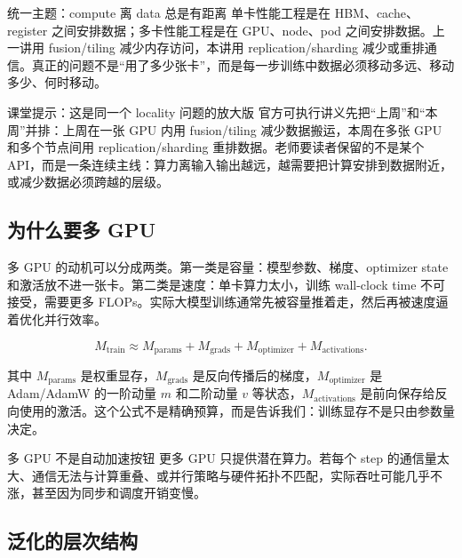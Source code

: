 \begin{importantbox}{统一主题：compute 离 data 总是有距离}
单卡性能工程是在 HBM、cache、register 之间安排数据；多卡性能工程是在 GPU、node、pod 之间安排数据。上一讲用 fusion/tiling 减少内存访问，本讲用 replication/sharding 减少或重排通信。真正的问题不是“用了多少张卡”，而是每一步训练中数据必须移动多远、移动多少、何时移动。
\end{importantbox}

\begin{knowledgebox}{课堂提示：这是同一个 locality 问题的放大版}
官方可执行讲义先把“上周”和“本周”并排：上周在一张 GPU 内用 fusion/tiling 减少数据搬运，本周在多张 GPU 和多个节点间用 replication/sharding 重排数据。老师要读者保留的不是某个 API，而是一条连续主线：算力离输入输出越远，越需要把计算安排到数据附近，或减少数据必须跨越的层级。
\end{knowledgebox}

\subsection{为什么要多 GPU}

多 GPU 的动机可以分成两类。第一类是容量：模型参数、梯度、optimizer state 和激活放不进一张卡。第二类是速度：单卡算力太小，训练 wall-clock time 不可接受，需要更多 FLOPs。实际大模型训练通常先被容量推着走，然后再被速度逼着优化并行效率。

\[
M_{\text{train}}
    \approx M_{\text{params}}
    + M_{\text{grads}}
    + M_{\text{optimizer}}
    + M_{\text{activations}} .
\]

其中 \(M_{\text{params}}\) 是权重显存，\(M_{\text{grads}}\) 是反向传播后的梯度，\(M_{\text{optimizer}}\) 是 Adam/AdamW 的一阶动量 \(m\) 和二阶动量 \(v\) 等状态，\(M_{\text{activations}}\) 是前向保存给反向使用的激活。这个公式不是精确预算，而是告诉我们：训练显存不是只由参数量决定。

\begin{warningbox}{多 GPU 不是自动加速按钮}
更多 GPU 只提供潜在算力。若每个 step 的通信量太大、通信无法与计算重叠、或并行策略与硬件拓扑不匹配，实际吞吐可能几乎不涨，甚至因为同步和调度开销变慢。
\end{warningbox}

\subsection{泛化的层次结构}

